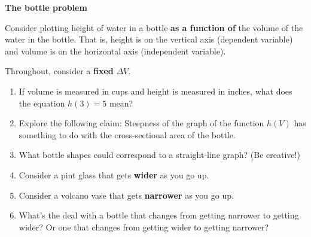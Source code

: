 \documentclass[10pt]{article}
\renewcommand{\section}[1]{\begin{center} \textbf{#1} \\\end{center}}
\begin{document}
%


\allowdisplaybreaks
\section{The bottle problem}

Consider plotting height of water in a bottle \textbf{as a function of} the volume of the water in the bottle. That is, height is on the vertical axis (dependent variable) and volume is on the horizontal axis (independent variable).

Throughout, consider a \textbf{fixed} $\Delta V$.

\begin{enumerate}[leftmargin=*]
\item 


If volume is measured in cups and height is measured in inches, what does the equation \( h(3) = 5\) mean?

\vspace{0.5in}

\item Explore the following claim: Steepness of the graph of the function $h(V)$ has something to do with the cross-sectional area of the bottle.

\vfill
\vfill

\item What bottle shapes could correspond to a straight-line graph? (Be creative!) 
\vfill

\item Consider a pint glass that gets \textbf{wider} as you go up. 

\vfill

\item Consider a volcano vase that gets \textbf{narrower} as you go up.

\vfill

\item What's the deal with a bottle that changes from getting narrower to getting wider? Or one that changes from getting wider to getting narrower?

\vfill

\end{enumerate}
\end{document}
